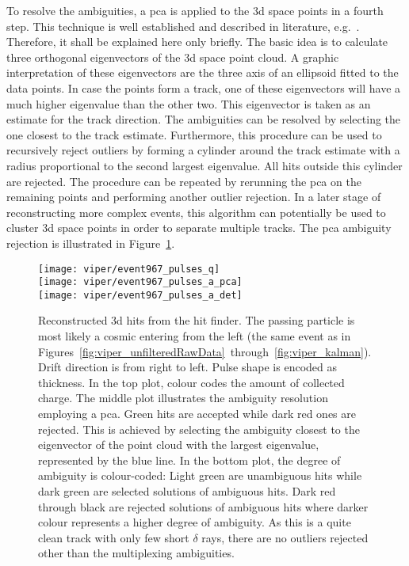 To resolve the ambiguities, a \gls{pca} is applied to the \gls{3d} space points in a fourth step.
This technique is well established and described in literature, e.g.~\cite{pca}.
Therefore, it shall be explained here only briefly.
The basic idea is to calculate three orthogonal eigenvectors of the \gls{3d} space point cloud.
A graphic interpretation of these eigenvectors are the three axis of an ellipsoid fitted to the data points.
In case the points form a track, one of these eigenvectors will have a much higher eigenvalue than the other two.
This eigenvector is taken as an estimate for the track direction.
The ambiguities can be resolved by selecting the one closest to the track estimate.
Furthermore, this procedure can be used to recursively reject outliers by forming a cylinder around the track estimate with a radius proportional to the second largest eigenvalue.
All hits outside this cylinder are rejected.
The procedure can be repeated by rerunning the \gls{pca} on the remaining points and performing another outlier rejection.
In a later stage of reconstructing more complex events, this algorithm can potentially be used to cluster \gls{3d} space points in order to separate multiple tracks.
The \gls{pca} ambiguity rejection is illustrated in Figure~\ref{fig:viper_pca}.

\begin{figure}[htb]
	\centering
	\texttt{[image: viper/event967\_pulses\_q]} \\
	\texttt{[image: viper/event967\_pulses\_a\_pca]} \\
	\texttt{[image: viper/event967\_pulses\_a\_det]}
	\caption[Reconstructed  hits of typical pixel demonstrator event]{%
		Reconstructed \acrshort{3d} hits from the hit finder.
		The passing particle is most likely a cosmic \Pgm entering from the left (the same event as in Figures~\ref{fig:viper_unfilteredRawData}~through~\ref{fig:viper_kalman}).
		Drift direction is from right to left.
		Pulse shape is encoded as thickness.
		In the top plot, colour codes the amount of collected charge.
		The middle plot illustrates the ambiguity resolution employing a \acrshort{pca}.
		Green hits are accepted while dark red ones are rejected.
		This is achieved by selecting the ambiguity closest to the eigenvector of the point cloud with the largest eigenvalue, represented by the blue line.
		In the bottom plot, the degree of ambiguity is colour-coded: Light green are unambiguous hits while dark green are selected solutions of ambiguous hits.
		Dark red through black are rejected solutions of ambiguous hits where darker colour represents a higher degree of ambiguity.
		As this is a quite clean track with only few short $\delta$ rays, there are no outliers rejected other than the multiplexing ambiguities.
	}
	\label{fig:viper_pca}
\end{figure}

